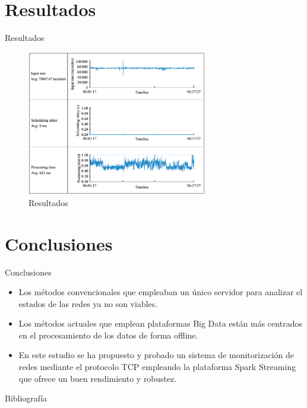 \documentclass[aspectratio=149]{beamer}
\begin{document}
\section{Resultados}
\begin{frame}[label=result]{Resultados}
	\begin{figure}
	    \centering
	    \includegraphics[width=0.7\textwidth]{img/results.png}
	    \caption{Resultados}
	    \label{fig:results}
	\end{figure}
\end{frame}

\section{Conclusiones}
\begin{frame}[label=conclu]{Conclusiones}
    \begin{itemize}
        \item Los métodos convencionales que empleaban un único servidor para analizar el estados de las redes ya no son viables.
        \item Los métodos actuales que emplean plataformas Big Data están más centrados en el procesamiento de los datos de forma offline.
        \item En este estudio\cite{8268735} se ha propuesto y probado un sistema de monitorización de redes mediante el protocolo TCP empleando la plataforma Spark Streaming que ofrece un buen rendimiento y robustez.
    \end{itemize}
\end{frame}

\begin{frame}{Bibliografía}
    \printbibliography
\end{frame}
\end{document}
